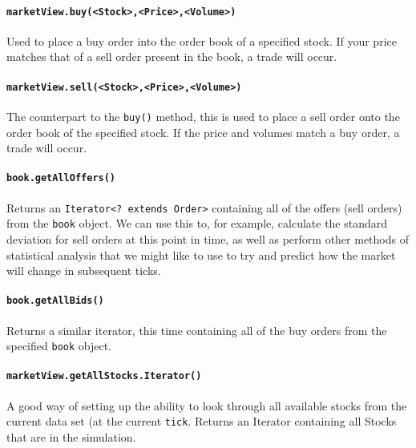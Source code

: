 \documentclass[11pt]{article}
\begin{document}
\paragraph{\texttt{marketView.buy(<Stock>,<Price>,<Volume>)}} Used to place a buy order into the order book of a specified stock. If your price matches that of a sell order present in the book, a trade will occur.
\paragraph{\texttt{marketView.sell(<Stock>,<Price>,<Volume>)}} The counterpart to the \texttt{buy()} method, this is used to place a sell order onto the order book of the specified stock. If the price and volumes match a buy order, a trade will occur.
\paragraph{\texttt{book.getAllOffers()}}Returns an \texttt{Iterator<?~extends Order>} containing all of the offers (sell orders) from the \texttt{book} object. We can use this to, for example, calculate the standard deviation for sell orders at this point in time, as well as perform other methods of statistical analysis that we might like to use to try and predict how the market will change in subsequent ticks.
\paragraph{\texttt{book.getAllBids()}}Returns a similar iterator, this time containing all of the buy orders from the specified \texttt{book} object.
\paragraph{\texttt{marketView.getAllStocks.Iterator()}} A good way of setting up the ability to look through all available stocks from the current data set (at the current \texttt{tick}. Returns an Iterator containing all Stocks that are in the simulation.
\end{document}
